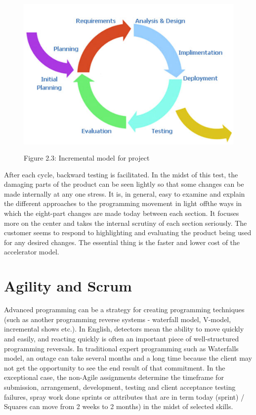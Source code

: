 \documentclass[oneside,12pt]{Classes/VTU}
\begin{document}
    	
    	\begin{figure}
    		\begin{center}
    			\includegraphics[]{images/cycle.jpg}
    		\end{center}
    		
    		
    		\begin{center}
    			Figure 2.3: Incremental model\tiny\textcolor{white}{s}\normalsize for project
    		\end{center}
    	\end{figure}
    	After each cycle, backward testing is facilitated. In the midst of this test, the damaging parts of the product can be seen lightly so that some changes can be made internally at any one stress. It is, in general, easy to examine and explain the different approaches to the programming movement\tiny\textcolor{white}{s}\normalsize in light\tiny\textcolor{white}{s}\normalsize of\tiny\textcolor{white}{f}\normalsize the ways in which the eight-part changes are made today between each section. It focuses more on the center and takes the internal scrutiny of each section seriously. The customer seems to respond to highlighting and evaluating the product being used for any desired changes. The essential thing is the faster and lower cost of the accelerator model.
    	
    	\section{Agility and Scrum}
    	Advanced programming can be a strategy for creating programming techniques (such as another programming reverse systems - waterfall model, V-model, incremental shows etc.). In English, detectors mean the ability to move quickly and easily, and reacting quickly is often an important piece of well-structured programming reversals.
    	In traditional expert programming such as Waterfalls model, an outage can take several months and a long time because the client may not get the opportunity to see the end result of that commitment. In the exceptional case, the non-Agile assignments determine the timeframe for submission, arrangement, development, testing and client acceptance testing failures, spray work done sprints or attributes that are in term today (sprint) / Squares can move from 2 weeks to 2 months) in the midst of selected skills.
    	
\end{document}
